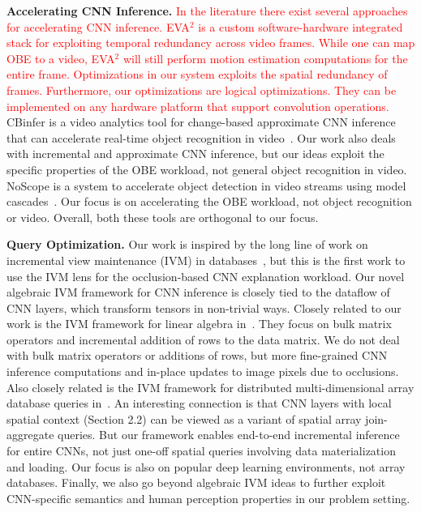 \documentclass[10pt, sigconf]{acmart}
\newcommand{\red}{\textcolor{red}}
\begin{document}
\vspace{2mm}
\noindent \textbf{Accelerating CNN Inference.} 
\red{In the literature there exist several approaches for accelerating CNN inference. EVA$^2$ \cite{buckler2018eva} is a custom software-hardware integrated stack for exploiting temporal redundancy across video frames.
While one can map OBE to a video, EVA$^2$ will still perform motion estimation computations for the entire frame. Optimizations in our system exploits the spatial redundancy of frames.
Furthermore, our optimizations are logical optimizations. They can be implemented on any hardware platform that support convolution operations.}
CBinfer is a video analytics tool for change-based approximate CNN inference that can accelerate real-time object recognition in video~\cite{cavigelli2017cbinfer}. Our work also deals with incremental and approximate CNN inference, but our ideas exploit the specific properties of the OBE workload, not general object recognition in video. NoScope is a system to accelerate object detection in video streams using model cascades~\cite{kang2017noscope}.
Our focus is on accelerating the OBE workload, not object recognition or video.
Overall, both these tools are orthogonal to our focus.


\vspace{2mm}
\noindent \textbf{Query Optimization.}
Our work is inspired by the long line of work on incremental view maintenance (IVM) in databases~\cite{chirkova2012materialized, gupta1995maintenance, levy1995answering}, but this is the first work to use the IVM lens for the occlusion-based CNN explanation workload. Our novel algebraic IVM framework for CNN inference is closely tied to the dataflow of CNN layers, which transform tensors in non-trivial ways. Closely related to our work is the IVM framework for linear algebra in~\cite{nikolic2014linview}. They focus on bulk matrix operators and incremental addition of rows to the data matrix. We do not deal with bulk matrix operators or additions of rows, but more fine-grained CNN inference computations and in-place updates to image pixels due to occlusions. Also closely related is the IVM framework for distributed multi-dimensional array database queries in~\cite{zhao2017incremental}. An interesting connection is that CNN layers with local spatial context (Section 2.2) can be viewed as a variant of spatial array join-aggregate queries. But our framework enables end-to-end incremental inference for entire CNNs, not just one-off spatial queries involving data materialization and loading. Our focus is also on popular deep learning environments, not array databases. Finally, we also go beyond algebraic IVM ideas to further exploit CNN-specific semantics and human perception properties in our problem setting.
\end{document}
